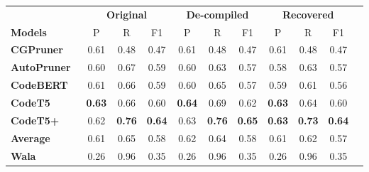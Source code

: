 \begin{tabular}{@{}lcccccccccc@{}}
\toprule
& \multicolumn{3}{c}{\textbf{Original}} & \multicolumn{3}{c}{\textbf{De-compiled}} & \multicolumn{3}{c}{\textbf{Recovered}} \\
\cmidrule(lr){2-4} \cmidrule(lr){5-7} \cmidrule(lr){8-10}
{\bf Models} & P & R & F1 & P & R & F1 & P & R & F1 \\
\midrule
\textbf{CGPruner~\cite{utture2022striking}}\tnote{1} & 0.61 & 0.48 & 0.47 & 0.61 & 0.48 & 0.47 & 0.61 & 0.48 & 0.47  \\
\textbf{AutoPruner~\cite{le2022autopruner}} & 0.60 & 0.67 & 0.59 & 0.60 & 0.63 & 0.57 & 0.58 & 0.63  & 0.57 \\
\textbf{CodeBERT} & 0.61 & 0.66 & 0.59 & 0.60 & 0.65 & 0.57 & 0.59 & 0.61 & 0.56 \\
\textbf{CodeT5} & \textbf{0.63} & 0.66 & 0.60 & \textbf{0.64} & 0.69 & 0.62 & \textbf{0.63} & 0.64 & 0.60 \\
\textbf{CodeT5+} & 0.62 & \textbf{0.76} & \textbf{0.64} & 0.63 & \textbf{0.76} & \textbf{0.65} & \textbf{0.63} & \textbf{0.73} &  \textbf{0.64} \\
\midrule
\textbf{Average} & 0.61 & 0.65 & 0.58 & 0.62 & 0.64 & 0.58 & 0.61 & 0.62 & 0.57 \\
\midrule
\textbf{Wala} & 0.26 & 0.96 & 0.35 & 0.26 & 0.96 & 0.35 & 0.26 & 0.96 & 0.35 \\
\bottomrule
\end{tabular}